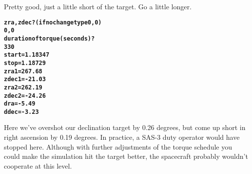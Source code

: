 \documentclass[11pt]{article}
\begin{document}
Pretty good, just a little short of the target. Go a little longer.

\begin{alltt}
\bfseries
      zra,zdec? (if no change type 0,0)
0,0
      duration of torque (seconds)?
330
 start=     1.18347
 stop=     1.18729
 zra1= 267.68
 zdec1= -21.03
 zra2= 262.19
 zdec2= -24.26
 dra=  -5.49
 ddec=  -3.23
\end{alltt}

Here we've overshot our declination target by 0.26 degrees, but come up short in right ascension by 0.19 degrees. In practice, a SAS-3 duty operator would have stopped here. Although with further adjustments of the torque schedule you could make the simulation hit the target better, the spacecraft probably wouldn't cooperate at this level.


 
\end{document}
